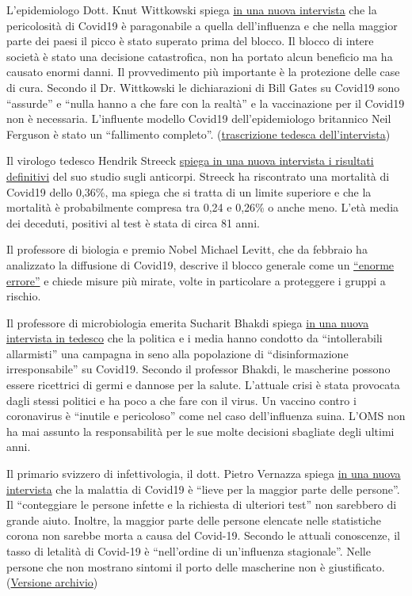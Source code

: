 L'epidemiologo Dott. Knut Wittkowski spiega
\href{https://www.youtube.com/watch?v=k0Q4naYOYDw}{in una nuova
intervista} che la pericolosità di Covid19 è paragonabile a quella
dell'influenza e che nella maggior parte dei paesi il picco è stato
superato prima del blocco. Il blocco di intere società è stato una
decisione catastrofica, non ha portato alcun beneficio ma ha causato
enormi danni. Il provvedimento più importante è la protezione delle case
di cura. Secondo il Dr. Wittkowski le dichiarazioni di Bill Gates su
Covid19 sono ``assurde'' e ``nulla hanno a che fare con la realtà'' e la
vaccinazione per il Covid19 non è necessaria. L'influente modello
Covid19 dell'epidemiologo britannico Neil Ferguson è stato un
``fallimento completo''.
(\href{https://vitalstoff.blog/2020/05/01/wir-brauchen-keinen-impfstoff/}{trascrizione
tedesca dell'intervista})

Il virologo tedesco Hendrik Streeck
\href{https://www.youtube.com/watch?v=vrL9QKGQrWk}{spiega in una nuova
intervista i risultati definitivi} del suo studio sugli anticorpi.
Streeck ha riscontrato una mortalità di Covid19 dello 0,36\%, ma spiega
che si tratta di un limite superiore e che la mortalità è probabilmente
compresa tra 0,24 e 0,26\% o anche meno. L'età media dei deceduti,
positivi al test è stata di circa 81 anni.

Il professore di biologia e premio Nobel Michael Levitt, che da febbraio
ha analizzato la diffusione di Covid19, descrive il blocco generale come
un \href{https://www.youtube.com/watch?v=bl-sZdfLcEk}{``enorme errore''}
e chiede misure più mirate, volte in particolare a proteggere i gruppi a
rischio.

Il professore di microbiologia emerita Sucharit Bhakdi spiega
\href{https://www.servustv.com/videos/aa-23ud73pbh1w12/}{in una nuova
intervista in tedesco} che la politica e i media hanno condotto da
``intollerabili allarmisti'' una campagna in seno alla popolazione di
``disinformazione irresponsabile'' su Covid19. Secondo il professor
Bhakdi, le mascherine possono essere ricettrici di germi e dannose per
la salute. L'attuale crisi è stata provocata dagli stessi politici e ha
poco a che fare con il virus. Un vaccino contro i coronavirus è
``inutile e pericoloso'' come nel caso dell'influenza suina. L'OMS non
ha mai assunto la responsabilità per le sue molte decisioni sbagliate
degli ultimi anni.

Il primario svizzero di infettivologia, il dott. Pietro Vernazza spiega
\href{https://www.saldo.ch/artikel/artikeldetail/fuer-die-allermeisten-menschen-verlaeuft-die-erkrankung-mild/}{in
una nuova intervista} che la malattia di Covid19 è ``lieve per la
maggior parte delle persone''. Il ``conteggiare le persone infette e la
richiesta di ulteriori test'' non sarebbero di grande aiuto. Inoltre, la
maggior parte delle persone elencate nelle statistiche corona non
sarebbe morta a causa del Covid-19. Secondo le attuali conoscenze, il
tasso di letalità di Covid-19 è ``nell'ordine di un'influenza
stagionale''. Nelle persone che non mostrano sintomi il porto delle
mascherine non è giustificato.
(\href{https://swprs.files.wordpress.com/2020/05/saldo-interview-pietro-vernazza-14-04-2020.pdf}{Versione
archivio})

